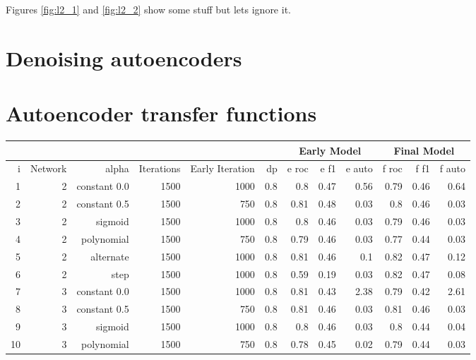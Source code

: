     Figures \ref{fig:l2_1} and \ref{fig:l2_2} show some stuff but lets ignore it.

    \newpage

    \section{Denoising autoencoders}
  \section{Autoencoder transfer functions}
    \begin{table}[!h] { \small \centering
    		\begin{tabular}{rrrrrrrrrrrr}
    			&&&&& &  \multicolumn{3}{|c|}{Early Model} &  \multicolumn{3}{c|}{Final Model}    \\
    			\hline
    			i  & Network & alpha      & Iterations & Early Iteration & dp  & e roc & e f1 & e auto & f roc & f f1 & f auto \\
    			\hline
           1 & 2 & constant 0.0 & 1500 &  1000 &  0.8 &    0.8  &   0.47 &     0.56 &    0.79 &   0.46 &     0.64 \\
    			 2  & 2       & constant 0.5   & 1500       & 750             & 0.8 & 0.81  & 0.48 & 0.03   & 0.8   & 0.46 & 0.03   \\
    			 3  & 2       & sigmoid    & 1500       & 1000            & 0.8 & 0.8   & 0.46 & 0.03   & 0.79  & 0.46 & 0.03   \\
    			 4  & 2       & polynomial & 1500       & 750             & 0.8 & 0.79  & 0.46 & 0.03   & 0.77  & 0.44 & 0.03   \\
    			 5  & 2       & alternate  & 1500       & 1000            & 0.8 & 0.81  & 0.46 & 0.1    & 0.82  & 0.47 & 0.12   \\
           6 & 2 & step     & 1500 &  1000 &  0.8 &    0.59 &   0.19 &     0.03 &    0.82 &   0.47 &     0.08 \\
    			\hline
           7 & 3 & constant 0.0 & 1500 &  1000 &  0.8 &    0.81 &   0.43 &     2.38 &    0.79 &   0.42 &     2.61 \\
    			 8  & 3       & constant 0.5   & 1500       & 750             & 0.8 & 0.81  & 0.46 & 0.03   & 0.81  & 0.46 & 0.03   \\
    			 9  & 3       & sigmoid    & 1500       & 1000            & 0.8 & 0.8   & 0.46 & 0.03   & 0.8   & 0.44 & 0.04   \\
    		  10  & 3       & polynomial & 1500       & 750             & 0.8 & 0.78  & 0.45 & 0.02   & 0.79  & 0.44 & 0.03   \\

\end{tabular}}
\end{table}

